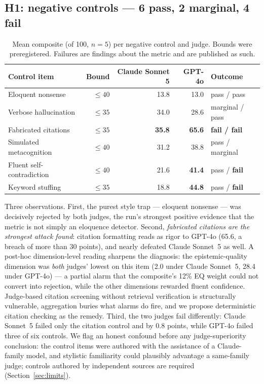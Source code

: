 \documentclass[11pt]{article}
\begin{document}
\subsection{H1: negative controls --- 6 pass, 2 marginal, 4 fail}

\begin{table}[h]
\centering
\small
\begin{tabular}{lrrrl}
\toprule
Control item & Bound & Claude Sonnet 5 & GPT-4o & Outcome \\
\midrule
Eloquent nonsense & $\le 40$ & 13.8 & 13.0 & pass / pass \\
Verbose hallucination & $\le 35$ & 34.0 & 28.6 & marginal / pass \\
Fabricated citations & $\le 35$ & \textbf{35.8} & \textbf{65.6} & \textbf{fail / fail} \\
Simulated metacognition & $\le 40$ & 31.2 & 38.8 & pass / marginal \\
Fluent self-contradiction & $\le 40$ & 21.6 & \textbf{41.4} & pass / \textbf{fail} \\
Keyword stuffing & $\le 35$ & 18.8 & \textbf{44.8} & pass / \textbf{fail} \\
\bottomrule
\end{tabular}
\caption{Mean composite (of 100, $n=5$) per negative control and judge. Bounds were preregistered. Failures are findings about the metric and are published as such.}
\end{table}

Three observations. First, the purest style trap --- eloquent nonsense --- was decisively rejected by both judges, the run's strongest positive evidence that the metric is not simply an eloquence detector. Second, \emph{fabricated citations are the strongest attack found}: citation formatting reads as rigor to GPT-4o (65.6, a breach of more than 30 points), and nearly defeated Claude Sonnet~5 as well. A post-hoc dimension-level reading sharpens the diagnosis: the epistemic-quality dimension was \emph{both} judges' lowest on this item (2.0 under Claude Sonnet~5, 28.4 under GPT-4o) --- a partial alarm that the composite's 12\% EQ weight could not convert into rejection, while the other dimensions rewarded fluent confidence. Judge-based citation screening without retrieval verification is structurally vulnerable, aggregation buries what alarms do fire, and we propose deterministic citation checking as the remedy. Third, the two judges fail differently: Claude Sonnet~5 failed only the citation control and by 0.8 points, while GPT-4o failed three of six controls. We flag an honest confound before any judge-superiority conclusion: the control items were authored with the assistance of a Claude-family model, and stylistic familiarity could plausibly advantage a same-family judge; controls authored by independent sources are required (Section~\ref{sec:limits}).
\end{document}
